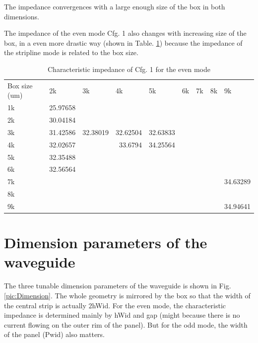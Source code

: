 \documentclass[noshowpacs,amsmath,
superscriptaddress,
10pt]{article}
\begin{document}
The impedance convergences with a large enough size of the box in both dimensions. 

The impedance of the even mode Cfg. 1 also changes with increasing size of the box, in a even more drastic way  (shown in Table. \ref{tab:even_impd}) because the impedance of the stripline mode is related to the box size. 

\begin{table}[htbp]
  \centering
  \caption{Characteristic impedance of Cfg. 1 for the even mode}
    \begin{tabular}{lrrrrrrrr}
    Box size (um) & \multicolumn{1}{l}{2k} & \multicolumn{1}{l}{3k} & \multicolumn{1}{l}{4k} & \multicolumn{1}{l}{5k} & \multicolumn{1}{l}{6k} & \multicolumn{1}{l}{7k} & \multicolumn{1}{l}{8k} & \multicolumn{1}{l}{9k} \\
    1k    & 25.97658 &       &       &       &       &       &       &  \\
    2k    & 30.04184 &       &       &       &       &       &       &  \\
    3k    & 31.42586 & 32.38019 & 32.62504 & 32.63833 &       &       &       &  \\
    4k    & 32.02657 &       & 33.6794 & 34.25564 &       &       &       &  \\
    5k    & 32.35488 &       &       &       &       &       &       &  \\
    6k    & 32.56564 &       &       &       &       &       &       &  \\
    7k    &       &       &       &       &       &       &       & 34.63289 \\
    8k    &       &       &       &       &       &       &       &  \\
    9k    &       &       &       &       &       &       &       & 34.94641 \\
    \end{tabular}%
  \label{tab:even_impd}%
\end{table}%

\section{Dimension parameters of the waveguide}

The three tunable dimension parameters of the waveguide is shown in Fig. \ref{pic:Dimension}. The whole geometry is mirrored by the box so that the width of the central strip is actually $2$hWid. For the even mode, the characteristic impedance is determined mainly by hWid and gap (might because there is no current flowing on the outer rim of the panel). But for the odd mode, the width of the panel (Pwid) also matters. 
\end{document}
